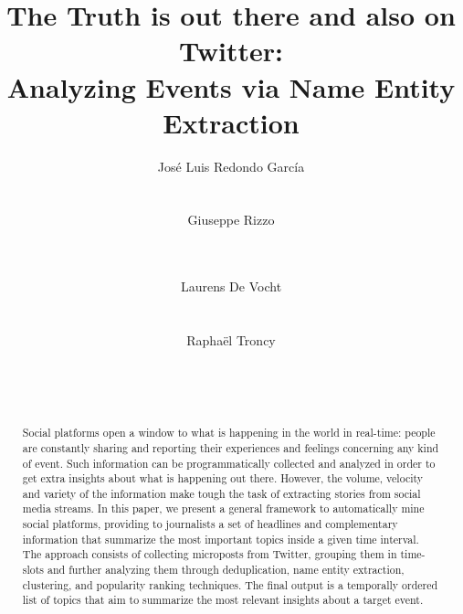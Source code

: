 \documentclass{sig-alternate}
\begin{document}
\title{The Truth is out there and also on Twitter: \\ Analyzing Events via Name Entity Extraction}

\author{
\alignauthor Jos\'e Luis Redondo Garc\'ia\\
	\\
	\\
\alignauthor Giuseppe Rizzo\\
	\\
	\\
\and
\alignauthor Laurens De Vocht\\
    \\
    \\
\alignauthor Rapha\"el Troncy\\
	\\
	\\
		\\
}

\maketitle


\begin{abstract}

Social platforms open a window to what is happening in the world in real-time: people are constantly sharing and reporting their experiences and feelings concerning any kind of event. Such information can be programmatically collected and analyzed in order to get extra insights about what is happening out there. However, the volume, velocity and variety of the information make tough the task of extracting stories from social media streams. In this paper, we present a general framework to automatically mine social platforms, providing to journalists a set of headlines and complementary information that summarize the most important topics inside a given time interval. The approach consists of collecting microposts from Twitter, grouping them in time-slots and further analyzing them through deduplication, name entity extraction, clustering, and popularity ranking techniques. The final output is a temporally ordered list of topics that aim to summarize the most relevant insights about a target event. 

\end{abstract}
\end{document}
